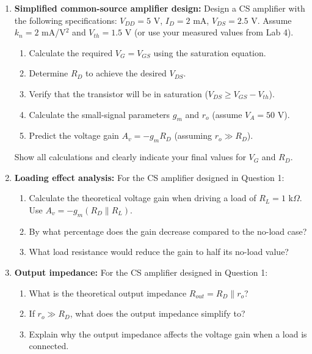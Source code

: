 \documentclass[10pt]{article}
\begin{document}
\begin{enumerate}
    
    \item \textbf{Simplified common-source amplifier design:} Design a CS amplifier with the following specifications:  $V_{DD} = 5$ V, $I_D = 2$ mA, $V_{DS} = 2.5$ V.  Assume $k_n = 2$ mA/V$^2$ and $V_{th} = 1.5$ V (or use your measured values from Lab 4).
    \begin{enumerate}
        \item Calculate the required $V_G = V_{GS}$ using the saturation equation. 
        \item Determine $R_D$ to achieve the desired $V_{DS}$.
        \item Verify that the transistor will be in saturation ($V_{DS} \geq V_{GS} - V_{th}$). 
        \item Calculate the small-signal parameters $g_m$ and $r_o$ (assume $V_A = 50$ V).
        \item Predict the voltage gain $A_v = -g_m R_D$ (assuming $r_o \gg R_D$).
    \end{enumerate}
    Show all calculations and clearly indicate your final values for $V_G$ and $R_D$.
    
    \item \textbf{Loading effect analysis:} For the CS amplifier designed in Question 1:
    \begin{enumerate}
        \item Calculate the theoretical voltage gain when driving a load of $R_L = 1$ k$\Omega$.  Use $A_v = -g_m (R_D \parallel R_L)$.
        \item By what percentage does the gain decrease compared to the no-load case?
        \item What load resistance would reduce the gain to half its no-load value?
    \end{enumerate}
    
    \item \textbf{Output impedance:} For the CS amplifier designed in Question 1:
    \begin{enumerate}
        \item What is the theoretical output impedance $R_{out} = R_D \parallel r_o$?
        \item If $r_o \gg R_D$, what does the output impedance simplify to?
        \item Explain why the output impedance affects the voltage gain when a load is connected.
    \end{enumerate}
    

\end{enumerate}
\end{document}
